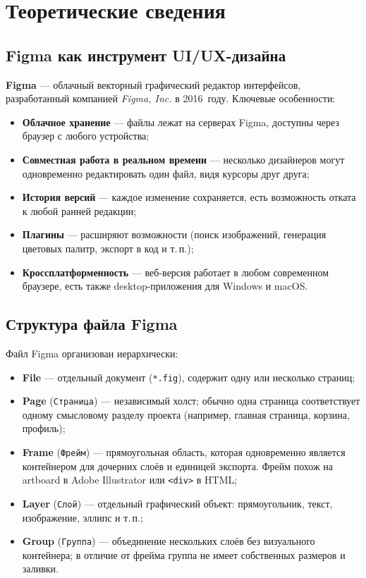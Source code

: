 \chapter{Теоретические сведения}
\label{ch:theory}

\section{Figma как инструмент UI/UX-дизайна}

\textbf{Figma} — облачный векторный графический редактор интерфейсов,
разработанный компанией \textit{Figma, Inc.} в 2016~году. Ключевые особенности:
\begin{itemize}
  \item \textbf{Облачное хранение} — файлы лежат на серверах Figma,
        доступны через браузер с любого устройства;
  \item \textbf{Совместная работа в реальном времени} — несколько
        дизайнеров могут одновременно редактировать один файл,
        видя курсоры друг друга;
  \item \textbf{История версий} — каждое изменение сохраняется, есть
        возможность отката к любой ранней редакции;
  \item \textbf{Плагины} — расширяют возможности (поиск изображений,
        генерация цветовых палитр, экспорт в код и т.\,п.);
  \item \textbf{Кроссплатформенность} — веб-версия работает в любом
        современном браузере, есть также desktop-приложения для
        Windows и macOS.
\end{itemize}

\section{Структура файла Figma}

Файл Figma организован иерархически:
\begin{itemize}
  \item \textbf{File} — отдельный документ (\texttt{*.fig}), содержит одну
        или несколько страниц;
  \item \textbf{Page} (\texttt{Страница}) — независимый холст; обычно одна
        страница соответствует одному смысловому разделу проекта
        (например, главная страница, корзина, профиль);
  \item \textbf{Frame} (\texttt{Фрейм}) — прямоугольная область, которая
        одновременно является контейнером для дочерних слоёв и единицей
        экспорта. Фрейм похож на artboard в Adobe Illustrator или
        \texttt{<div>} в HTML;
  \item \textbf{Layer} (\texttt{Слой}) — отдельный графический объект:
        прямоугольник, текст, изображение, эллипс и т.\,п.;
  \item \textbf{Group} (\texttt{Группа}) — объединение нескольких слоёв
        без визуального контейнера; в отличие от фрейма группа не имеет
        собственных размеров и заливки.
\end{itemize}

